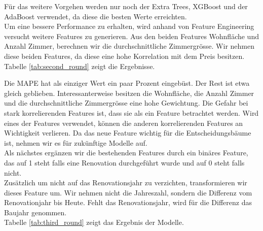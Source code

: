 %
Für das weitere Vorgehen werden nur noch der Extra Trees, XGBoost und der AdaBoost verwendet, da diese die besten Werte erreichten.\\[2ex]
%
Um eine bessere Performance zu erhalten, wird anhand von Feature Engineering versucht weitere Features zu generieren. Aus den beiden Features Wohnfläche und Anzahl Zimmer, berechnen wir die durchschnittliche Zimmergrösse. Wir nehmen diese beiden Features, da diese eine hohe Korrelation mit dem Preis besitzen. Tabelle \ref{tab:second_round} zeigt die Ergebnisse.\\[2ex]
%
\begin{table}[ht]
\centering
{}
\caption{Ergebnisse mit durchschnittlicher Zimmergrösse}
\label{tab:second_round}
\end{table}
%
Die MAPE hat als einziger Wert ein paar Prozent eingebüst. Der Rest ist etwa gleich geblieben. Interessanterweise besitzen die Wohnfläche, die Anzahl Zimmer und die durchschnittliche Zimmergrösse eine hohe Gewichtung. Die Gefahr bei stark korrelierenden Features ist, dass sie als ein Feature betrachtet werden. Wird eines der Features verwendet, können die anderen korrelierenden Features an Wichtigkeit verlieren. Da das neue Feature wichtig für die Entscheidungsbäume ist, nehmen wir es für zukünftige Modelle auf.\\[2ex] 
%
Als nächstes ergänzen wir die bestehenden Features durch ein binäres Feature, das auf 1 steht falls eine Renovation durchgeführt wurde und auf 0 steht falls nicht.\\
Zusätzlich um nicht auf das Renovationsjahr zu verzichten, transformieren wir dieses Feature um. Wir nehmen nicht die Jahreszahl, sondern die Differenz vom Renovationjahr bis Heute. Fehlt das Renovationsjahr, wird für die Differenz das Baujahr genommen.\\
Tabelle \ref{tab:third_round} zeigt das Ergebnis der Modelle.\\[2ex]
%
\begin{table}[ht]
\centering
{}
\caption{Ergebnisse mit Einbezug der Renovation}
\label{tab:third_round}
\end{table}
